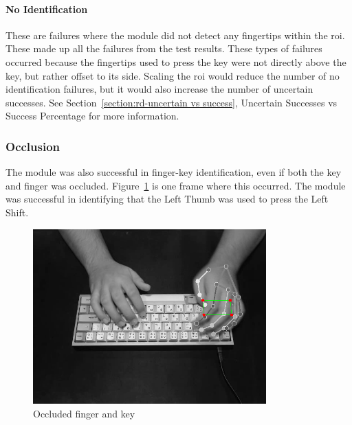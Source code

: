 \documentclass{report}
\begin{document}
\paragraph{No Identification}
These are failures where the module did not detect any fingertips within the
\ac{roi}. These made up all the failures from the test results. These types of
failures occurred because the fingertips used to press the key were not directly
above the key, but rather offset to its side. Scaling the \ac{roi} would reduce
the number of no identification failures, but it would also increase the number
of uncertain successes. See Section~\ref{section:rd-uncertain vs success},
Uncertain Successes vs Success Percentage for more information.

\subsubsection{Occlusion}
The module was also successful in finger-key identification, even if both the
key and finger was occluded. Figure~\ref{fig:rd-occluded} is one frame where
this occurred. The module was successful in identifying that the Left Thumb was
used to press the Left Shift.

\begin{figure}[H]
	\centering
	\includegraphics[width=0.8\textwidth]{occluded.png}
	\caption{Occluded finger and key}
	\label{fig:rd-occluded}
\end{figure}
\end{document}
